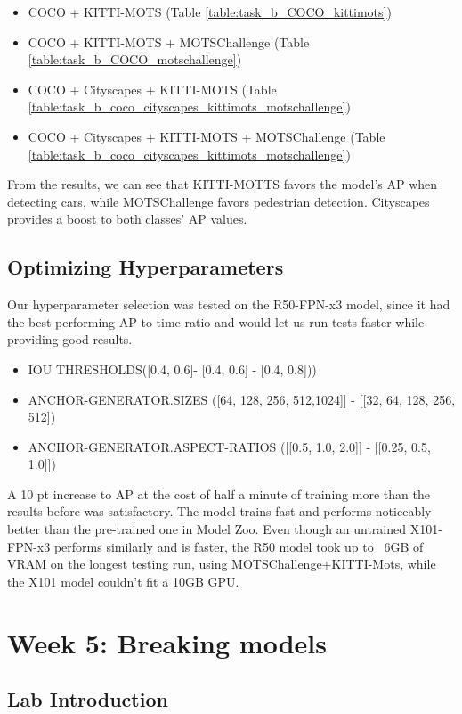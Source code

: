 \documentclass[11pt,a4paper,twocolumn,twoside]{article}
\begin{document}
\begin{itemize}
    \item COCO + KITTI-MOTS (Table \ref{table:task_b_COCO_kittimots})
    \item COCO + KITTI-MOTS + MOTSChallenge (Table \ref{table:task_b_COCO_motschallenge})
    \item COCO + Cityscapes + KITTI-MOTS (Table \ref{table:task_b_coco_cityscapes_kittimots_motschallenge})
    \item COCO + Cityscapes + KITTI-MOTS + MOTSChallenge (Table \ref{table:task_b_coco_cityscapes_kittimots_motschallenge})
\end{itemize}

From the results, we can see that KITTI-MOTTS favors the model's AP when detecting cars, while MOTSChallenge favors pedestrian detection. Cityscapes provides a boost to both classes' AP values. 
\subsection{Optimizing Hyperparameters}
Our hyperparameter selection was tested on the R50-FPN-x3 model, since it had the best performing AP to time ratio and would let us run tests faster while providing good results.
\begin{itemize}
    \item IOU THRESHOLDS([0.4, 0.6]- [0.4, 0.6] - [0.4, 0.8]))
    \item ANCHOR-GENERATOR.SIZES ([64, 128, 256, 512,1024]] - [[32, 64, 128, 256, 512])
    \item ANCHOR-GENERATOR.ASPECT-RATIOS ([[0.5, 1.0, 2.0]] - [[0.25, 0.5, 1.0]])
\end{itemize}
A 10 pt increase to AP at the cost of half a minute of training more than the results before was satisfactory. The model trains fast and performs noticeably better than the pre-trained one in Model Zoo. Even though an untrained X101-FPN-x3 performs similarly and is faster, the R50 model took up to ~6GB of VRAM on the longest testing run, using MOTSChallenge+KITTI-Mots, while the X101 model couldn't fit a 10GB GPU.  \newpage
  
  
\section{Week 5: Breaking models}

\subsection{Lab Introduction}
\end{document}
